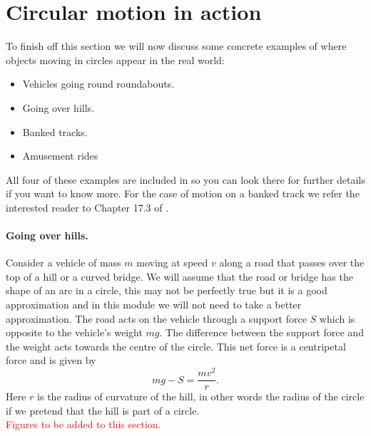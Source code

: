 \section{Circular motion in action}
To finish off this section we will now discuss some concrete examples of where objects moving in circles appear in the real world:
\begin{itemize}
\setlength{\itemsep}{-5pt}
    \item Vehicles going round roundabouts.
    \item Going over hills.
    \item Banked tracks.
    \item Amusement rides
\end{itemize} 
All four of these examples are included in \citep{breithaupt2016aqa} so you can look there for further details if you want to know more.  For the case of motion on a banked track we refer the interested reader to Chapter 17.3 of \citep{breithaupt2016aqa}.

\paragraph{Going over hills.} Consider a vehicle of mass $m$ moving at speed $v$ along a road that passes over the top of a hill or a curved bridge. We will assume that the road or bridge has the shape of an arc in a circle, this may not be perfectly true but it is a good approximation and in this module we will not need to take a better approximation. The road acts on the vehicle through a support force $S$ which is opposite to the vehicle's weight $mg$. The difference between the support force and the weight acts towards the centre of the circle. This net force is a centripetal force and is given by
\begin{equation*}
mg-S=\frac{mv^{2}}{r}.
\end{equation*}
Here $r$ is the radius of curvature of the hill, in other words the radius of the circle if we pretend that the hill is part of a circle.\\

\textcolor{red}{Figures to be added to this section.}\\

